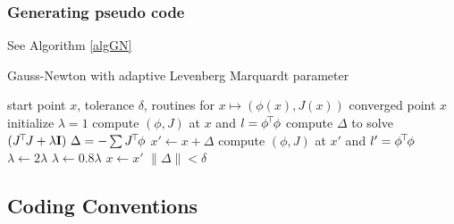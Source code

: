 \subsubsection{Generating pseudo code}

See Algorithm \ref{algGN}

\begin{algorithm}[ht]
\caption{Gauss-Newton with adaptive Levenberg Marquardt parameter}
\label{algGN}
\begin{algorithmic}[1]\small
\REQUIRE start point $x$, tolerance $\delta$, routines for $x \mapsto
  (\phi(x), J(x))$
\ENSURE converged point $x$
\STATE initialize $\lambda=1$
\STATE compute $(\phi, J)$ at $x$ and $l=\phi^{\!\top\!} \phi$
\REPEAT
\STATE\label{redo} compute $\Delta$ to solve $(J^{\!\top\!} J +\lambda {\rm\bf I})~ \Delta = - \sum
J^{\!\top\!} \phi$
\STATE $x' \gets x + \Delta$
\STATE compute $(\phi, J)$ at $x'$ and $l'=\phi^{\!\top\!} \phi$
\STATE $\lambda \gets 2\lambda$
\ELSE
\STATE $\lambda \gets 0.8\lambda$
\STATE $x \gets x'$
\ENDIF
\UNTIL $\|\Delta\| < \delta$
\end{algorithmic}
\end{algorithm}



\subsection{Coding Conventions}

